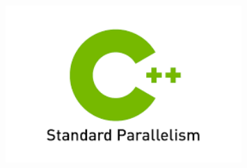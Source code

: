 \documentclass[aspectratio=1610,10pt]{penchbeamer}
\begin{document}
\begin{frame}
\begin{minipage}{0.3\textwidth}
    \begin{figure}
      \begin{center}
        \includegraphics[width=0.8\textwidth]{static/stdpar.png}
      \end{center}
    \end{figure}
  \end{minipage}


\end{frame}
\end{document}
